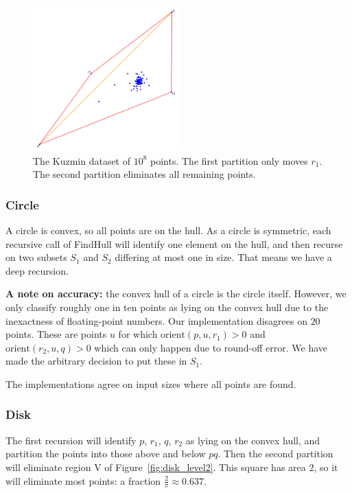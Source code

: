 \begin{figure}[ht]
    \centering
    \includegraphics[width=0.5\textwidth]{./figures/rust-kuzmin.png}
    \caption{The Kuzmin dataset of $10^8$ points. The first partition only
             moves $r_1$. The second partition eliminates all remaining points.}
    \label{fig:kuzmin}
\end{figure}

\subsubsection{Circle}

A circle is convex, so all points are on the hull. As a circle is symmetric,
each recursive call of FindHull will identify one element on the hull, and
then recurse on two subsets $S_1$ and $S_2$ differing at most one in size.
That means we have a deep recursion.

\textbf{A note on accuracy: }the convex hull of a circle is the circle itself.
However, we only classify roughly one in ten points as lying on the convex
hull due to the inexactness of floating-point numbers. Our implementation
disagrees on $20$ points. These are points $u$ for which
$\text{orient}(p, u, r_1) > 0$ and $\text{orient}(r_2, u, q) > 0$ which can
only happen due to round-off error. We have made the arbitrary decision to put
these in $S_1$.

The implementations agree on input sizes where all points are found.

\subsubsection{Disk}

The first recursion will identify $p$, $r_1$, $q$, $r_2$ as lying on the
convex hull, and partition the points into those above and below $pq$.
Then the second partition will eliminate region V of 
Figure~\ref{fig:disk_level2}. This square has area $2$, so it will eliminate
most points: a fraction $\frac{2}{\pi} \approx 0.637$.

